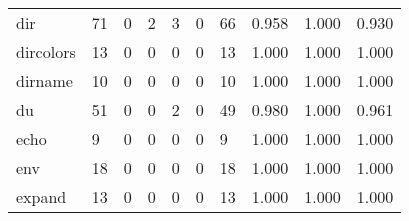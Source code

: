 \begin{longtable}{lp{1.3cm}p{1.3cm}p{1.3cm}p{1.3cm}p{1.3cm}p{1.3cm}p{1.3cm}p{1.3cm}p{1.3cm}}
dir       &                     71 &                                             0 &                                            2 &                                           3 &                                            0 &                                         66 &                                0.958 &                                  1.000 &                                0.930 \\
dircolors &                     13 &                                             0 &                                            0 &                                           0 &                                            0 &                                         13 &                                1.000 &                                  1.000 &                                1.000 \\
dirname   &                     10 &                                             0 &                                            0 &                                           0 &                                            0 &                                         10 &                                1.000 &                                  1.000 &                                1.000 \\
du        &                     51 &                                             0 &                                            0 &                                           2 &                                            0 &                                         49 &                                0.980 &                                  1.000 &                                0.961 \\
echo      &                      9 &                                             0 &                                            0 &                                           0 &                                            0 &                                          9 &                                1.000 &                                  1.000 &                                1.000 \\
env       &                     18 &                                             0 &                                            0 &                                           0 &                                            0 &                                         18 &                                1.000 &                                  1.000 &                                1.000 \\
expand    &                     13 &                                             0 &                                            0 &                                           0 &                                            0 &                                         13 &                                1.000 &                                  1.000 &                                1.000 \\

\end{longtable}
